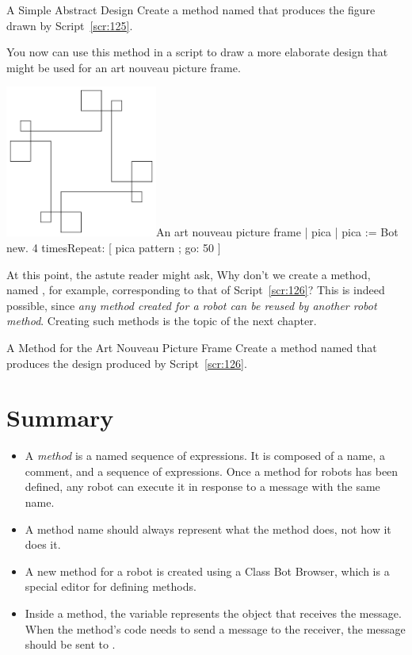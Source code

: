 \documentclass[a4paper,10pt,twoside]{book}
\begin{document}
\begin{exonofigtitle}{A Simple Abstract Design}
Create a method named  that produces the figure drawn by Script~\ref{scr:125}. 
\end{exonofigtitle}

You now can use this method in a script to draw a more elaborate design that might be 
used for an art nouveau picture frame. 


\begin{scriptfigwithsize}[0.4]{\includegraphics[width=5cm]{artNouveauFourScr}}{An art nouveau picture frame}\label{scr:126}
| pica | 
pica := Bot new. 
4 timesRepeat: [ pica pattern ; go: 50 ]
\end{scriptfigwithsize}

At this point, the astute reader might ask, Why don’t we create a method, named , 
for example, corresponding to that of Script~\ref{scr:126}? This is indeed possible, since \emph{any method 
created for a robot can be reused by another robot method}. Creating such methods is the topic 
of the next chapter. 

\begin{exonofigtitle}{A Method for the Art Nouveau Picture Frame}
Create a method named  that produces the design produced by Script~\ref{scr:126}.
\end{exonofigtitle}

\section{Summary} 

\begin{itemize}
\item A \emph{method} is a named sequence of expressions. It is composed of a name, a comment, 
and a sequence of expressions. Once a method for robots has been defined, any robot 
can execute it in response to a message with the same name. 
\item A method name should always represent what the method does, not how it does it. 
\item A new method for a robot is created using a Class Bot Browser, which is a special editor 
for defining methods. 
\item Inside a method, the variable  represents the object that receives the message. 
When the method’s code needs to send a message to the receiver, the message should 
be sent to .
\end{itemize}
\end{document}
